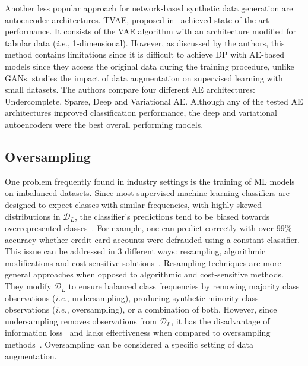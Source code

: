 \documentclass[parskip=full]{scrartcl}
\begin{document}
Another less popular approach for network-based synthetic data generation are
autoencoder architectures. TVAE, proposed in~\cite{xu2019modeling} achieved
state-of-the art performance.  It consists of the VAE algorithm with an
architecture modified for tabular data (\textit{i.e.}, 1-dimensional).
However, as discussed by the authors, this method contains limitations since
it is difficult to achieve DP with AE-based models since they access the
original data during the training procedure, unlike GANs.
\citet{delgado2021deep} studies the impact of data augmentation on supervised
learning with small datasets. The authors compare four different AE
architectures: Undercomplete, Sparse, Deep and Variational AE\@. Although any
of the tested AE architectures improved classification performance, the deep
and variational autoencoders were the best overall performing models.


\subsection{Oversampling}\label{sec:oversampling}

One problem frequently found in industry settings is the training of ML models
on imbalanced datasets. Since most supervised machine learning classifiers are
designed to expect classes with similar frequencies, with highly skewed
distributions in $\mathcal{D}_L$, the classifier’s predictions tend to be
biased towards overrepresented classes~\cite{fonseca2021improving}. For
example, one can predict correctly with over 99\% accuracy whether credit card
accounts were defrauded using a constant classifier. This issue can be
addressed in 3 different ways: resampling, algorithmic modifications and
cost-sensitive solutions~\cite{douzas2019imbalanced}. Resampling techniques
are more general approaches when opposed to algorithmic and cost-sensitive
methods. They modify $\mathcal{D}_L$ to ensure balanced class frequencies by
removing majority class observations (\textit{i.e.}, undersampling), producing
synthetic minority class observations (\textit{i.e.}, oversampling), or a
combination of both. However, since undersampling removes observations from
$\mathcal{D}_L$, it has the disadvantage of information
loss~\cite{feng2019imbalanced} and lacks effectiveness when compared to
oversampling methods~\cite{mohammed2020machine, hernandez2013empirical}.
Oversampling can be considered a specific setting of data augmentation.
\end{document}
